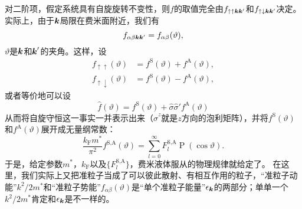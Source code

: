 \documentclass[hyperref, UTF8, a4paper]{ctexart}
\DeclareMathOperator{\legpoly}{P}
\begin{document}
对二阶项，假定系统具有自旋旋转不变性，则$f$的取值完全由$f_{\uparrow \uparrow \vb*{k} \vb*{k}'}$和$f_{\uparrow \downarrow \vb*{k} \vb*{k}'}$决定。
实际上，由于$\vb*{k}$局限在费米面附近，我们有
\[
    f_{\alpha \beta \vb*{k} \vb*{k}'} = f_{\alpha \beta}(\vartheta),
\]
$\vartheta$是$\vb*{k}$和$\vb*{k}'$的夹角。这样，设
\begin{equation}
    \begin{aligned}
        f_{\uparrow \uparrow}(\vartheta) &= f^\text{S}(\vartheta) + f^\text{A}(\vartheta), \\
        f_{\uparrow \downarrow}(\vartheta) &= f^\text{S}(\vartheta) - f^\text{A}(\vartheta),
    \end{aligned}
\end{equation}
或者等价地可以设
\begin{equation}
    \hat{f}(\vartheta) = f^\text{S}(\vartheta) + \hat{\sigma} \hat{\sigma}' f^\text{A}(\vartheta)
\end{equation}
从而将自旋守恒这一事实一并表示出来（$\hat{\sigma}^z$就是$z$方向的泡利矩阵），并将$f^\text{S}(\vartheta)$和$f^\text{A}(\vartheta)$展开成无量纲常数：
\begin{equation}
    \frac{k_\text{F} m^*}{\pi^2} f^\text{S,A}(\vartheta) = \sum_{l=0}^\infty F_l^\text{S,A} \legpoly (\cos \vartheta).
\end{equation}
于是，给定参数$m^*$，$k_\text{F}$以及$\{F_l^\text{S,A}\}$，费米液体服从的物理规律就给定了。
在这里，我们实际上又把准粒子当成了可以彼此散射、有相互作用的粒子，“准粒子动能”$k^2/2m^*$和“准粒子势能”$f_{\alpha \beta}(\vartheta)$是“单个准粒子能量”$\epsilon_{\vb*{k}}$的两部分；单单一个$k^2/2m^*$肯定和$\epsilon_{\vb*{k}}$是不一样的。
\end{document}
